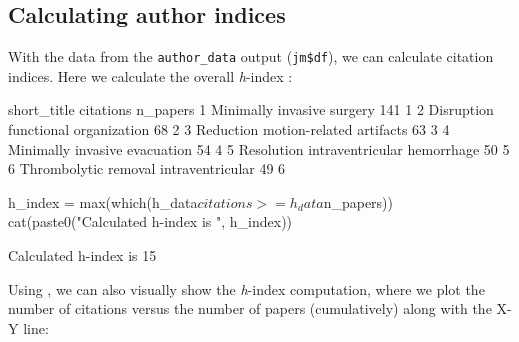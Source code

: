 \hypertarget{calculating-author-indices}{%
\subsection{Calculating author
indices}\label{calculating-author-indices}}

With the data from the \texttt{author\_data} output (\texttt{jm\$df}),
we can calculate citation indices. Here we calculate the overall
\emph{h}-index \citep{hirsch2005index}:

\begin{Schunk}
\begin{Soutput}
                             short_title citations n_papers
1             Minimally invasive surgery       141        1
2     Disruption functional organization        68        2
3     Reduction motion-related artifacts        63        3
4          Minimally invasive evacuation        54        4
5 Resolution intraventricular hemorrhage        50        5
6  Thrombolytic removal intraventricular        49        6
\end{Soutput}
\begin{Sinput}
h_index = max(which(h_data$citations >= h_data$n_papers))
cat(paste0("Calculated h-index is ", h_index))
\end{Sinput}
\begin{Soutput}
Calculated h-index is 15
\end{Soutput}
\end{Schunk}

Using  \citep{ggplot2}, we can also visually show the
\emph{h}-index computation, where we plot the number of citations versus
the number of papers (cumulatively) along with the X-Y line:

